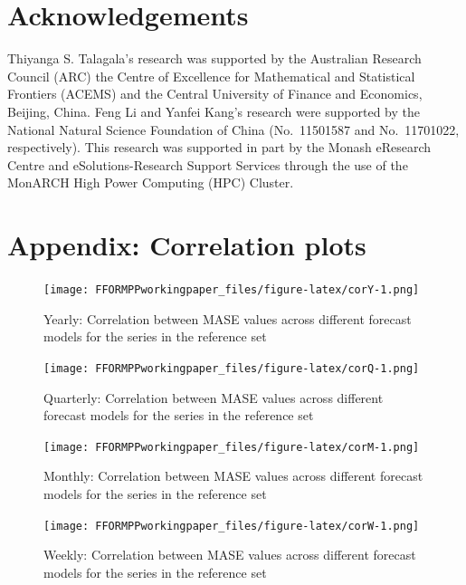\documentclass[11pt,a4paper,]{article}
\begin{document}
\hypertarget{acknowledgements}{%
\section{Acknowledgements}\label{acknowledgements}}

Thiyanga S. Talagala's research was supported by the Australian Research Council (ARC) the Centre of Excellence for Mathematical and Statistical Frontiers (ACEMS) and the Central University of Finance and Economics, Beijing, China. Feng Li and Yanfei Kang's research were supported by the National Natural Science Foundation of China (No.~11501587 and No.~11701022, respectively). This research was supported in part by the Monash eResearch Centre and eSolutions-Research Support Services through the use of the MonARCH High Power Computing (HPC) Cluster.

\hypertarget{appendix-correlation-plots}{%
\section*{Appendix: Correlation plots}\label{appendix-correlation-plots}}

\begin{figure}
\centering
\texttt{[image: FFORMPPworkingpaper\_files/figure-latex/corY-1.png]}
\caption{\label{fig:corY}Yearly: Correlation between MASE values across different forecast models for the series in the reference set}
\end{figure}

\begin{figure}
\centering
\texttt{[image: FFORMPPworkingpaper\_files/figure-latex/corQ-1.png]}
\caption{\label{fig:corQ}Quarterly: Correlation between MASE values across different forecast models for the series in the reference set}
\end{figure}

\begin{figure}
\centering
\texttt{[image: FFORMPPworkingpaper\_files/figure-latex/corM-1.png]}
\caption{\label{fig:corM}Monthly: Correlation between MASE values across different forecast models for the series in the reference set}
\end{figure}

\begin{figure}
\centering
\texttt{[image: FFORMPPworkingpaper\_files/figure-latex/corW-1.png]}
\caption{\label{fig:corW}Weekly: Correlation between MASE values across different forecast models for the series in the reference set}
\end{figure}
\end{document}

